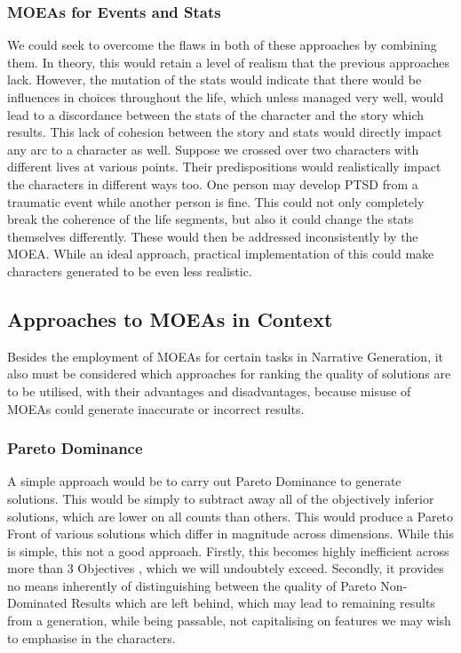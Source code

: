 \documentclass[11pt]{article}
\begin{document}
\subsubsection{MOEAs for Events and Stats} 
We could seek to overcome the flaws in both of these approaches by combining them. In theory, this would retain a level of realism that the previous approaches lack. However, the mutation of the stats would indicate that there would be influences in choices throughout the life, which unless managed very well, would lead to a discordance between the stats of the character and the story which results. This lack of cohesion between the story and stats would directly impact any arc to a character as well. Suppose we crossed over two characters with different lives at various points. Their predispositions would realistically impact the characters in different ways too. One person may develop PTSD from a traumatic event while another person is fine. This could not only completely break the coherence of the life segments, but also it could change the stats themselves differently. These would then be addressed inconsistently by the MOEA. While an ideal approach, practical implementation of this could make characters generated to be even less realistic. \\

\subsection{Approaches to MOEAs in Context}
Besides the employment of MOEAs for certain tasks in Narrative Generation, it also must be considered which approaches for ranking the quality of solutions are to be utilised, with their advantages and disadvantages, because misuse of MOEAs could generate inaccurate or incorrect results.
\subsubsection{Pareto Dominance}
A simple approach would be to carry out Pareto Dominance to generate solutions. This would be simply to subtract away all of the objectively inferior solutions, which are lower on all counts than others. This would produce a Pareto Front of various solutions which differ in magnitude across dimensions. While this is simple, this not a good approach. Firstly, this becomes highly inefficient across more than 3 Objectives \cite{AchievementScalarazingIndicatorBased}, which we will undoubtely exceed. Secondly, it provides no means inherently of distinguishing between the quality of Pareto Non-Dominated Results which are left behind, which may lead to remaining results from a generation, while being passable, not capitalising on features we may wish to emphasise in the characters.  
\end{document}
